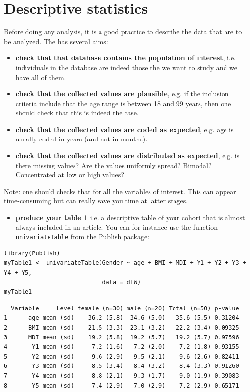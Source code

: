 \documentclass{article}
\begin{document}
\section{Descriptive statistics}
\label{sec:descriptive}
Before doing any analysis, it is a good practice to describe the data
that are to be analyzed. The has several aims:
\begin{itemize}
\item \textbf{check that that database contains the population of interest},
i.e. individuals in the database are indeed those the we want to
study and we have all of them.
\item \textbf{check that the collected values are plausible}, e.g. if the inclusion
criteria include that the age range is between 18 and 99 years, then
one should check that this is indeed the case.
\item \textbf{check that the collected values are coded as expected}, e.g. age is
usually coded in years (and not in months).
\item \textbf{check that the collected values are distributed as expected},
e.g. is there missing values? Are the values uniformly spread?
Bimodal? Concentrated at low or high values?
\end{itemize}

Note: one should checks that for all the variables of interest. This
can appear time-consuming but can really save you time at latter
stages. 

\begin{itemize}
\item \textbf{produce your table 1} i.e. a descriptive table of your cohort that
is almost always included in an article. You can for instance use
the function \texttt{univariateTable} from the Publish package:
\end{itemize}
\lstset{language=r,label= ,caption= ,captionpos=b,numbers=none}
\begin{lstlisting}
library(Publish)
myTable1 <- univariateTable(Gender ~ age + BMI + MDI + Y1 + Y2 + Y3 + Y4 + Y5, 
							data = dfW)
myTable1
\end{lstlisting}

\begin{verbatim}
  Variable     Level female (n=30) male (n=20) Total (n=50) p-value
1      age mean (sd)    36.2 (5.8)  34.6 (5.0)   35.6 (5.5) 0.31204
2      BMI mean (sd)    21.5 (3.3)  23.1 (3.2)   22.2 (3.4) 0.09325
3      MDI mean (sd)    19.2 (5.8)  19.2 (5.7)   19.2 (5.7) 0.97596
4       Y1 mean (sd)     7.2 (1.6)   7.2 (2.0)    7.2 (1.8) 0.93155
5       Y2 mean (sd)     9.6 (2.9)   9.5 (2.1)    9.6 (2.6) 0.82411
6       Y3 mean (sd)     8.5 (3.4)   8.4 (3.2)    8.4 (3.3) 0.91260
7       Y4 mean (sd)     8.8 (2.1)   9.3 (1.7)    9.0 (1.9) 0.39083
8       Y5 mean (sd)     7.4 (2.9)   7.0 (2.9)    7.2 (2.9) 0.65171
\end{verbatim}
\end{document}

